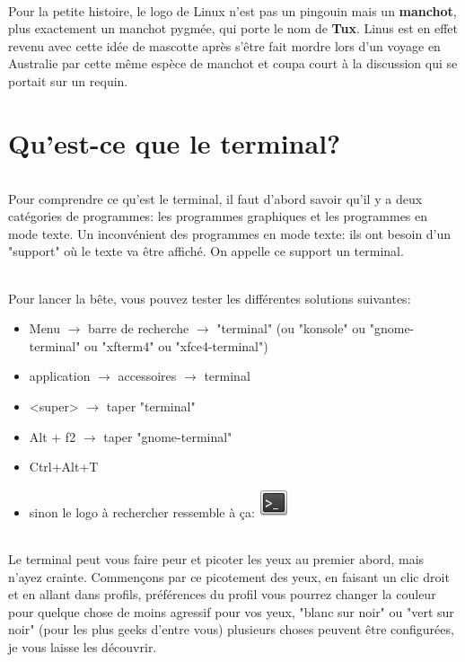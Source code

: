 \documentclass[french, a4paper, 12pt, titlepage]{article}
\begin{document}
\paragraph{}
Pour la petite histoire, le logo de Linux n'est pas un pingouin mais un
\textbf{manchot}, plus exactement un manchot pygmée, qui porte le nom de
\textbf{Tux}. Linus est en effet revenu avec cette idée de mascotte après
s'être fait mordre lors d'un voyage en Australie par cette même espèce de
manchot et coupa court à la discussion qui se portait sur un requin.

\part{Qu'est-ce que le terminal?}

\paragraph{} Pour comprendre ce qu'est le terminal, il faut d'abord savoir
qu'il y a deux catégories de programmes: les programmes graphiques et les
programmes en mode texte. Un inconvénient des programmes en mode texte: ils ont
besoin d'un "support" où le texte va être affiché. On appelle ce support un
terminal.

\paragraph{} Pour lancer la bête, vous pouvez tester les différentes solutions
suivantes:
\begin{itemize}
	\item Menu $\rightarrow$ barre de recherche $\rightarrow$ "terminal" (ou
		"konsole" ou "gnome-terminal" ou "xfterm4" ou "xfce4-terminal")
	\item application $\rightarrow$ accessoires $\rightarrow$ terminal
	\item <super> $\rightarrow$ taper "terminal"
	\item Alt + f2 $\rightarrow$ taper "gnome-terminal"
	\item Ctrl+Alt+T
	\item sinon le logo à rechercher ressemble à ça:
		\includegraphics[scale=0.7]{Images/termIcon}
\end{itemize}

\paragraph{} Le terminal peut vous faire peur et picoter les yeux au premier
abord, mais n'ayez crainte. Commençons par ce picotement des yeux,
en faisant un clic droit et en allant dans profils, préférences du profil vous
pourrez changer la couleur pour quelque chose de moins agressif pour vos yeux,
"blanc sur noir" ou "vert sur noir" (pour les plus geeks d'entre vous)
plusieurs choses peuvent être configurées, je vous laisse les découvrir.
\end{document}
